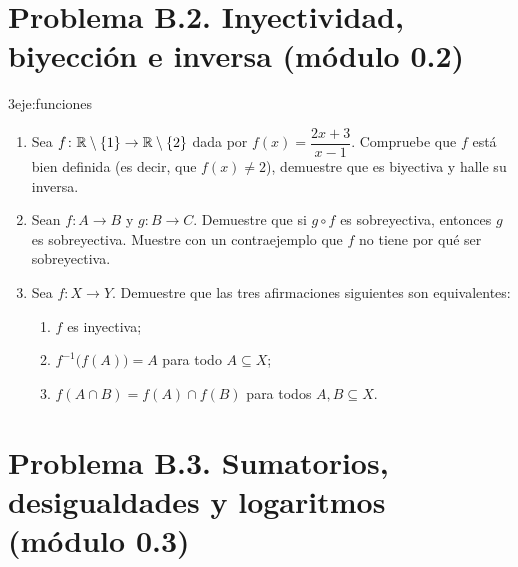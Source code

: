 \section*{Problema B.2. Inyectividad, biyección e inversa (módulo 0.2)}

\begin{ejercicio}{3}{eje:funciones}
\begin{enumerate}[label=(\alph*)]
  \item {} Sea $f\colon\mathbb{R}\setminus\{1\}\to\mathbb{R}\setminus\{2\}$ dada por $f(x)=\dfrac{2x+3}{x-1}$. Compruebe que $f$ está bien definida (es decir, que $f(x)\neq2$), demuestre que es biyectiva y halle su inversa.
  \item {} Sean $f\colon A\to B$ y $g\colon B\to C$. Demuestre que si $g\circ f$ es sobreyectiva, entonces $g$ es sobreyectiva. Muestre con un contraejemplo que $f$ no tiene por qué ser sobreyectiva.
  \item {} Sea $f\colon X\to Y$. Demuestre que las tres afirmaciones siguientes son equivalentes:
  \begin{enumerate}[label=(\roman*)]
    \item $f$ es inyectiva;
    \item $f^{-1}\bigl(f(A)\bigr)=A$ para todo $A\subseteq X$;
    \item $f(A\cap B)=f(A)\cap f(B)$ para todos $A,B\subseteq X$.
  \end{enumerate}
\end{enumerate}
\end{ejercicio}

\section*{Problema B.3. Sumatorios, desigualdades y logaritmos (módulo 0.3)}

